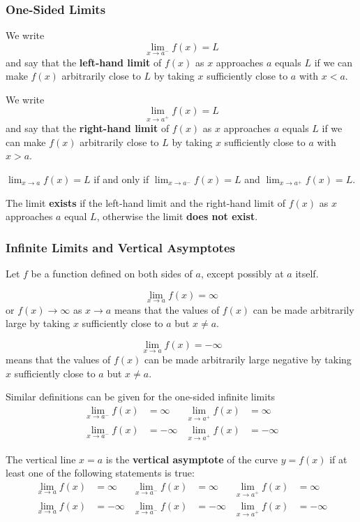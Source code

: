 \subsubsection*{One-Sided Limits}
\begin{definition}
    We write
    \[\lim_{x\to a^-}f(x)=L\]
    and say that the \textbf{left-hand limit} of \(f(x)\) as \(x\) approaches
    \(a\) equals \(L\) if we can make \(f(x)\) arbitrarily close to \(L\) by
    taking \(x\) sufficiently close to \(a\) with \(x<a\).
\end{definition}
\begin{definition}
    We write
    \[\lim_{x\to a^+}f(x)=L\]
    and say that the \textbf{right-hand limit} of \(f(x)\) as \(x\) approaches
    \(a\) equals \(L\) if we can make \(f(x)\) arbitrarily close to \(L\) by
    taking \(x\) sufficiently close to \(a\) with \(x>a\).
\end{definition}
\begin{theorem}
    \(\displaystyle{\lim_{x\to a}f(x)=L}\) if and only if
    \(\displaystyle{\lim_{x\to a^-}f(x)}=L\) and
    \(\displaystyle{\lim_{x\to a^+}f(x)}=L\).
\end{theorem}
The limit \textbf{exists} if the left-hand limit and the right-hand limit of
\(f(x)\) as \(x\) approaches \(a\) equal \(L\), otherwise the limit
\textbf{does not exist}.

\subsubsection*{Infinite Limits and Vertical Asymptotes}
Let \(f\) be a function defined on both sides of \(a\),
except possibly at \(a\) itself.
\begin{definition}
    \[\lim_{x\to a}f(x)=\infty\]
    or \(f(x)\to\infty\) as \(x\to a\) means that the values of \(f(x)\) can
    be made arbitrarily large by taking \(x\) sufficiently close to \(a\) but
    \(x\neq a\).
\end{definition}
\begin{definition}
    \[\lim_{x\to a}f(x)=-\infty\]
    means that the values of \(f(x)\) can be made arbitrarily large negative
    by taking \(x\) sufficiently close to \(a\) but \(x\neq a\).
\end{definition}
Similar definitions can be given for the one-sided infinite limits
\begin{align*}
    \lim_{x\to a^-}f(x) &= \infty & \lim_{x\to a^+}f(x) &= \infty \\
    \lim_{x\to a^-}f(x) &= -\infty & \lim_{x\to a^+}f(x) &= -\infty
\end{align*}
\begin{definition}
    The vertical line \(x=a\) is the \textbf{vertical asymptote} of the curve
    \(y=f(x)\) if at least one of the following statements is true:
    \begin{align*}
        \lim_{x\to a}f(x) &= \infty & \lim_{x\to a^-}f(x) &= \infty
        & \lim_{x\to a^+}f(x) &= \infty \\
        \lim_{x\to a}f(x) &= -\infty & \lim_{x\to a^-}f(x) &= -\infty
        & \lim_{x\to a^+}f(x) &= -\infty
    \end{align*}
\end{definition}